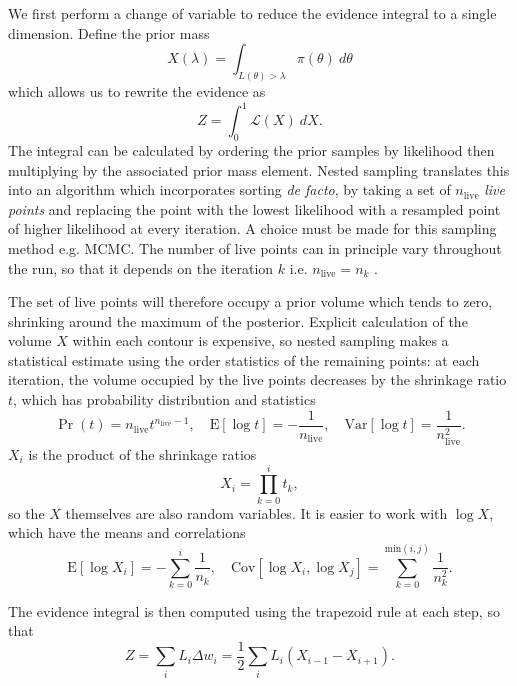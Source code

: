 \documentclass[usenatbib]{mnras}
\newcommand{\nlive}{n_\mathrm{live}}
\newcommand{\Like}{\mathcal{L}}
\begin{document}
We first perform a change of variable to reduce the evidence integral to a single dimension. Define the prior mass 
\begin{equation}\label{X integral}
    X(\lambda) = \int_{L(\theta)>\lambda} \pi(\theta) \ d\theta 
\end{equation}
which allows us to rewrite the evidence as 
\begin{equation}
    Z = \int_0^1 \Like(X) \ dX.
\end{equation}
The integral can be calculated by ordering the prior samples by likelihood then multiplying by the associated prior mass element. Nested sampling translates this into an algorithm which incorporates sorting \textit{de facto}, by taking a set of $\nlive$ \textit{live points} and replacing the point with the lowest likelihood with a resampled point of higher likelihood at every iteration. A choice must be made for this sampling method e.g. MCMC. The number of live points can in principle vary throughout the run, so that it depends on the iteration $k$ i.e. $n_\mathrm{live}=n_k$ \citep{dynamic_ns}. 
\par
The set of live points will therefore occupy a prior volume which tends to zero, shrinking around the maximum of the posterior. Explicit calculation of the volume $X$ within each contour is expensive, so nested sampling makes a statistical estimate using the order statistics of the remaining points: at each iteration, the volume occupied by the live points decreases by the shrinkage ratio $t$, which has probability distribution and statistics
\begin{equation}
	\Pr(t) = \nlive t^{\nlive - 1}, \quad \mathrm{E}[\log t] = -\frac{1}{\nlive}, \quad \mathrm{Var}[\log t] = \frac{1}{\nlive^2}.
\end{equation}
$X_i$ is the product of the shrinkage ratios
\begin{equation}\label{xi_formula}
    X_i = \prod_{k=0}^{i} t_k,
\end{equation}
so the $X$ themselves are also random variables. It is easier to work with $\log X$, which have the means and correlations
\begin{equation}\label{X_distribution}
	\mathrm{E}[\log X_i] = -\sum_{k=0}^{i} \frac{1}{n_k}, \quad
	\mathrm{Cov}[\log X_i, \log X_j] = \sum_{k=0}^{\mathrm{min}(i, j)} \frac{1}{n_k^2}.
\end{equation}

The evidence integral is then computed using the trapezoid rule at each step, so that
\begin{equation}
	Z = \sum_i L_i \Delta w_i = \frac{1}{2}\sum_i L_i \left( X_{i-1} - X_{i+1} \right).
\end{equation}
\end{document}
